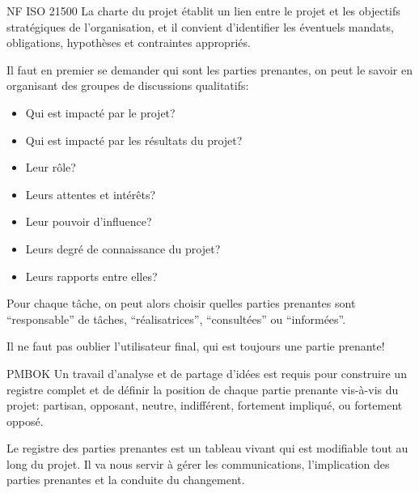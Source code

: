 \documentclass[10pt,a4paper,french]{article}
\begin{document}
\begin{cquote}{NF ISO 21500}
La charte du projet établit un lien entre le projet et les objectifs stratégiques de l'organisation, et il convient d'identifier les éventuels mandats, obligations, hypothèses et contraintes appropriés.
\end{cquote}

Il faut en premier se demander qui sont les parties prenantes, on peut le savoir en organisant des groupes de discussions qualitatifs:
\begin{itemize}
\item Qui est impacté par le projet?
\item Qui est impacté par les résultats du projet?
\item Leur rôle?
\item Leurs attentes et intérêts?
\item Leur pouvoir d'influence?
\item Leurs degré de connaissance du projet?
\item Leurs rapports entre elles?
\end{itemize}

Pour chaque tâche, on peut alors choisir quelles parties prenantes sont ``responsable'' de tâches, ``réalisatrices'', ``consultées'' ou ``informées''.

Il ne faut pas oublier l'utilisateur final, qui est toujours une partie prenante!

\begin{cquote}{PMBOK}
Un travail d'analyse et de partage d'idées est requis pour construire un registre complet et de définir la position de chaque partie prenante vis-à-vis du projet: partisan, opposant, neutre, indifférent, fortement impliqué, ou fortement opposé.

Le registre des parties prenantes est un tableau vivant qui est modifiable tout au long du projet. Il va nous servir à gérer les communications, l'implication des parties prenantes et la conduite du changement.
\end{cquote}
\end{document}
